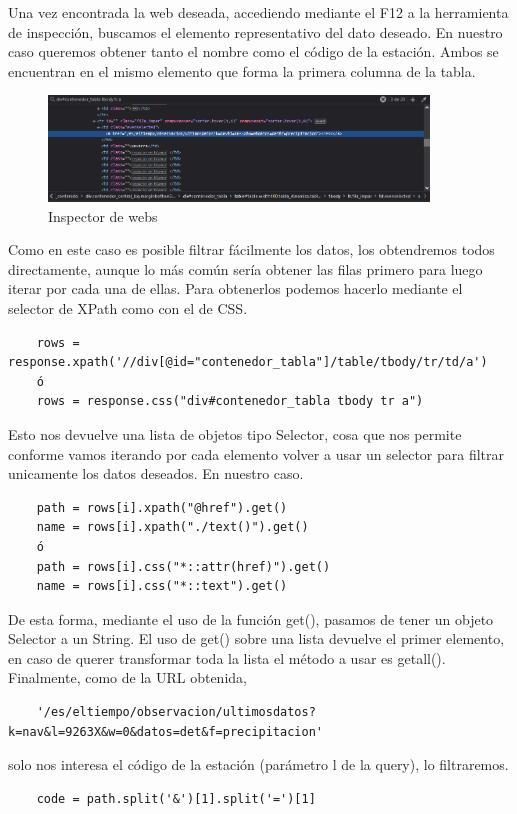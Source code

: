 Una vez encontrada la web deseada, accediendo mediante el F12 a la herramienta de inspección, buscamos el elemento representativo del dato deseado. En nuestro caso queremos obtener tanto el nombre como el código de la estación. Ambos se encuentran en el mismo elemento que forma la primera columna de la tabla.\newline

\begin{figure} [H]
	\centering
	\includegraphics[width=0.9\textwidth]{fig/inspector.png}
	\caption[Inspector de webs de Chrome]{Inspector de webs}
	\label{fig:ej14}
\end{figure}

Como en este caso es posible filtrar fácilmente los datos, los obtendremos todos directamente, aunque lo más común sería obtener las filas primero para luego iterar por cada una de ellas. Para obtenerlos podemos hacerlo mediante el selector de XPath como con el de CSS.\newline

\begin{verbatim}
	rows = response.xpath('//div[@id="contenedor_tabla"]/table/tbody/tr/td/a')
	ó
	rows = response.css("div#contenedor_tabla tbody tr a")
\end{verbatim}

Esto nos devuelve una lista de objetos tipo Selector, cosa que nos permite conforme vamos iterando por cada elemento volver a usar un selector para filtrar unicamente los datos deseados. En nuestro caso.

\begin{verbatim}
	path = rows[i].xpath("@href").get()
	name = rows[i].xpath("./text()").get()
	ó
	path = rows[i].css("*::attr(href)").get()
	name = rows[i].css("*::text").get()
\end{verbatim}

De esta forma, mediante el uso de la función get(), pasamos de tener un objeto Selector a un String. El uso de get() sobre una lista devuelve el primer elemento, en caso de querer transformar toda la lista el método a usar es getall().\newline
\newline
Finalmente, como de la URL obtenida,
\begin{verbatim}
	'/es/eltiempo/observacion/ultimosdatos?k=nav&l=9263X&w=0&datos=det&f=precipitacion'
\end{verbatim}
solo nos interesa el código de la estación (parámetro l de la query), lo filtraremos.
\begin{verbatim}
	code = path.split('&')[1].split('=')[1]
\end{verbatim}

